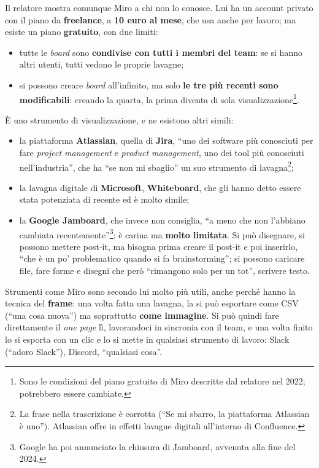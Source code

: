 Il relatore mostra comunque Miro a chi non lo conosce. Lui ha un account privato
con il piano da \textbf{freelance}, a \textbf{10 euro al mese}, che usa anche per
lavoro; ma esiste un piano \textbf{gratuito}, con due limiti:
\begin{itemize}
  \item tutte le \emph{board} sono \textbf{condivise con tutti i membri del
        team}: se si hanno altri utenti, tutti vedono le proprie lavagne;
  \item si possono creare \emph{board} all'infinito, ma solo \textbf{le tre più
        recenti sono modificabili}: creando la quarta, la prima diventa di sola
        visualizzazione\footnote{Sono le condizioni del piano gratuito di Miro
        descritte dal relatore nel 2022; potrebbero essere cambiate.}.
\end{itemize}
È uno strumento di visualizzazione, e ne esistono altri simili:
\begin{itemize}
  \item la piattaforma \textbf{Atlassian}, quella di \textbf{Jira}, ``uno dei
        software più conosciuti per fare \emph{project management} e
        \emph{product management}, uno dei tool più conosciuti nell'industria'',
        che ha ``se non mi sbaglio'' un suo strumento di lavagna\footnote{La
        frase nella trascrizione è corrotta (``Se mi sbarro, la piattaforma
        Atlassian è uno''). Atlassian offre in effetti lavagne digitali
        all'interno di Confluence.};
  \item la lavagna digitale di \textbf{Microsoft}, \textbf{Whiteboard}, che gli
        hanno detto essere stata potenziata di recente ed è molto simile;
  \item la \textbf{Google Jamboard}, che invece non consiglia, ``a meno che non
        l'abbiano cambiata recentemente''\footnote{Google ha poi annunciato la
        chiusura di Jamboard, avvenuta alla fine del 2024.}: è carina ma
        \textbf{molto limitata}. Si può disegnare, si possono mettere post-it,
        ma bisogna prima creare il post-it e poi inserirlo, ``che è un po'
        problematico quando si fa brainstorming''; si possono caricare file,
        fare forme e disegni che però ``rimangono solo per un tot'', scrivere
        testo.
\end{itemize}

Strumenti come Miro sono secondo lui molto più utili, anche perché hanno la
tecnica del \textbf{frame}: una volta fatta una lavagna, la si può esportare
come CSV (``una cosa nuova'') ma soprattutto \textbf{come immagine}. Si può
quindi fare direttamente il \emph{one page} lì, lavorandoci in sincronia con
il team, e una volta finito lo si esporta con un clic e lo si mette in
qualsiasi strumento di lavoro: Slack (``adoro Slack''), Discord, ``qualsiasi
cosa''.

